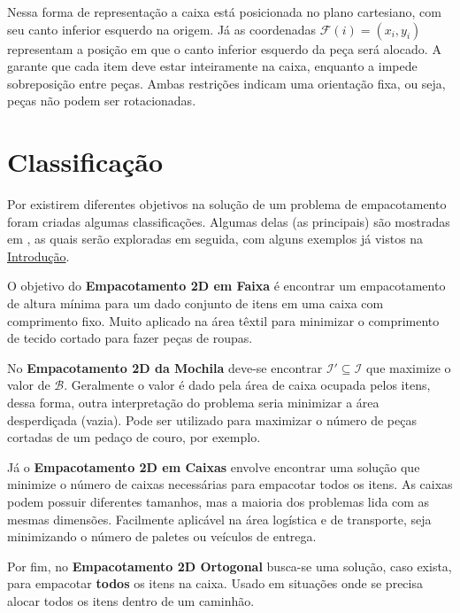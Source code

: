 Nessa forma de representação a caixa está posicionada no plano cartesiano, com seu canto inferior esquerdo na origem.
Já as coordenadas $\mathcal{F}(i) = (x_i, y_i)$ representam a posição em que o canto inferior esquerdo da peça será alocado.
A  garante que cada item deve estar inteiramente na caixa, enquanto a  impede sobreposição entre peças.
Ambas restrições indicam uma orientação fixa, ou seja, peças não podem ser rotacionadas.


\section{Classificação}\label{sec:classificacao}

Por existirem diferentes objetivos na solução de um problema de empacotamento foram criadas algumas classificações.
Algumas delas (as principais) são mostradas em \cite{exact-solution-techniques}, as quais serão exploradas em seguida, com alguns exemplos já vistos na \href{ch:introducao}{Introdução}.

O objetivo do \textbf{Empacotamento 2D em Faixa} é encontrar um empacotamento de altura mínima para um dado conjunto de itens em uma caixa com comprimento fixo.
Muito aplicado na área têxtil para minimizar o comprimento de tecido cortado para fazer peças de roupas.

No \textbf{Empacotamento 2D da Mochila} deve-se encontrar $\mathcal{I}' \subseteq \mathcal{I}$ que maximize o valor de $\mathcal{B}$.
Geralmente o valor é dado pela área de caixa ocupada pelos itens, dessa forma, outra interpretação do problema seria minimizar a área desperdiçada (vazia).
Pode ser utilizado para maximizar o número de peças cortadas de um pedaço de couro, por exemplo.

Já o \textbf{Empacotamento 2D em Caixas} envolve encontrar uma solução que minimize o número de caixas necessárias para empacotar todos os itens.
As caixas podem possuir diferentes tamanhos, mas a maioria dos problemas lida com as mesmas dimensões.
Facilmente aplicável na área logística e de transporte, seja minimizando o número de paletes ou veículos de entrega.

Por fim, no \textbf{Empacotamento 2D Ortogonal} busca-se uma solução, caso exista, para empacotar \textbf{todos} os itens na caixa.
Usado em situações onde se precisa alocar todos os itens dentro de um caminhão.

